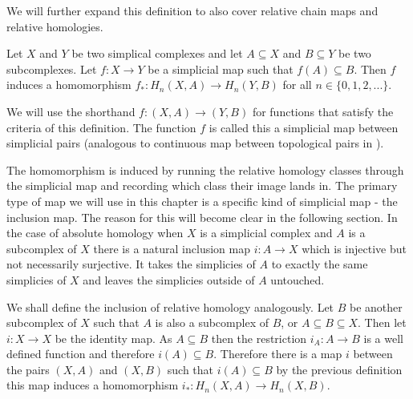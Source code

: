 We will further expand this definition to also cover relative chain maps and relative homologies.

\begin{defn} Let $X$ and $Y$ be two simplical complexes and let $A \subseteq X$ and $B \subseteq Y$ be two subcomplexes. Let $f: X \to Y$ be a simplicial map such that $f(A) \subseteq B$. Then $f$ induces a homomorphism $f_*: H_n(X, A) \to H_n(Y, B)$ for all $n \in \{0, 1, 2, ...\}$. \end{defn}

We will use the shorthand $f: (X, A) \to (Y, B)$ for functions that satisfy the criteria of this definition. The function $f$ is called this a simplicial map between simplicial pairs (analogous to continuous map between topological pairs in \cite{algebraic-topology}). 


The homomorphism is induced by running the relative homology classes through the simplicial map and recording which class their image lands in. The primary type of map we will use in this chapter is a specific kind of simplicial map - the inclusion map. The reason for this will become clear in the following section. In the case of absolute homology when $X$ is a simplicial complex and $A$ is a subcomplex of $X$ there is a natural inclusion map $i: A \to X$ which is injective but not necessarily surjective. It takes the simplicies of $A$ to exactly the same simplicies of $X$ and leaves the simplicies outside of $A$ untouched. 

We shall define the inclusion of relative homology analogously. Let $B$ be another subcomplex of $X$ such that $A$ is also a subcomplex of $B$, or $A \subseteq B \subseteq X$. Then let $i : X \to X$ be the identity map. As $A \subseteq B$ then the restriction $i_A: A \to B$ is a well defined function and therefore $i(A) \subseteq B$. Therefore there is a map $i$ between the pairs $(X, A)$ and $(X, B)$ such that $i(A) \subseteq B$ by the previous definition this map induces a homomorphism $i_* : H_n(X, A) \to H_n(X, B)$.


